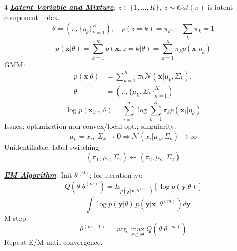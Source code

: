 \documentclass[12pt]{article}
\newcommand{\bulletPoint}[1]{\ul{\textit{\textbf{#1}}}}
\begin{document}
\begin{multicols*}{4}
\bulletPoint{Latent Variable and Mixture}:
$z\in\{1,\ldots,K\},\ z\sim Cat(\pi)$ is latent component index.
\useshortskip \begin{equation*}
    \scriptstyle \theta=(\pi,\{\eta_k\}_{k=1}^K),\quad
    p(z=k)=\pi_k,\quad \sum_k\pi_k=1
\end{equation*}
\useshortskip \begin{equation*}
    p(\mathbf{x}|\theta)=\sum_{k=1}^K p(\mathbf{x},z=k|\theta)
    =\sum_{k=1}^K \pi_k p(\mathbf{x}|\eta_k)
\end{equation*}
GMM:
\useshortskip \begin{equation*}
    \begin{split}
        p(\mathbf{x}|\theta)&=\sum_{k=1}^K\pi_k\mathcal{N}(\mathbf{x}|\mu_k,\Sigma_k),\\
        \theta&=(\pi,\{\mu_k,\Sigma_k\}_{k=1}^K)
    \end{split}
\end{equation*}
\useshortskip \begin{equation*}
    \scriptstyle \log p(\mathbf{x}_{1:n}|\theta)=\sum_{i=1}^n
    \log\sum_{k=1}^K \pi_k p(\mathbf{x}_i|\eta_k)
\end{equation*}
Issues: optimization non-convex/local opt.; singularity:
\useshortskip \begin{equation*}
    \mu_k=x_i,\ \Sigma_k\to0\Rightarrow \mathcal{N}(x_i|\mu_k,\Sigma_k)\to\infty
\end{equation*}
Unidentifiable: label switching
\useshortskip \begin{equation*}
    (\pi_1,\mu_1,\Sigma_1)\leftrightarrow(\pi_2,\mu_2,\Sigma_2)
\end{equation*}

\bulletPoint{EM Algorithm}:
Init $\theta^{(0)}$; for iteration $m$:
\useshortskip \begin{equation*}
    \scriptstyle Q(\theta|\theta^{(m)})=E_{p(\mathbf{y}|\mathbf{x},\theta^{(m)})}
    [\log p(\mathbf{y}|\theta)]
\end{equation*}
\useshortskip \begin{equation*}
    \scriptstyle =\int \log p(\mathbf{y}|\theta)\,
    p(\mathbf{y}|\mathbf{x},\theta^{(m)})d\mathbf{y}
\end{equation*}
M-step:
\useshortskip \begin{equation*}
    \theta^{(m+1)}=\arg\max_{\theta\in\Theta}Q(\theta|\theta^{(m)})
\end{equation*}
Repeat E/M until convergence.


\end{multicols*}
\end{document}

